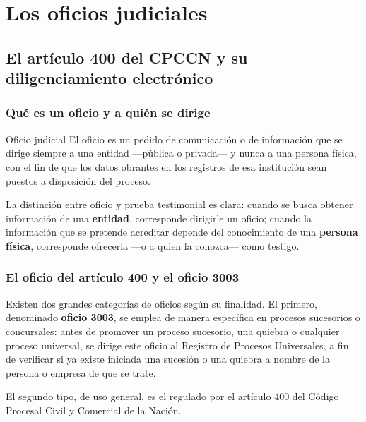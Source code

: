 \documentclass[12pt,oneside]{book}
\begin{document}
\chapter{Los oficios judiciales}

\section{El artículo 400 del CPCCN y su diligenciamiento electrónico}

\subsection{Qué es un oficio y a quién se dirige}

\begin{definition}{Oficio judicial}
El oficio es un pedido de comunicación o de información que se dirige siempre a una entidad —pública o privada— y nunca a una persona física, con el fin de que los datos obrantes en los registros de esa institución sean puestos a disposición del proceso.
\end{definition}

\begin{note}
La distinción entre oficio y prueba testimonial es clara: cuando se busca obtener información de una \textbf{entidad}, corresponde dirigirle un oficio; cuando la información que se pretende acreditar depende del conocimiento de una \textbf{persona física}, corresponde ofrecerla —o a quien la conozca— como testigo.
\end{note}

\subsection{El oficio del artículo 400 y el oficio 3003}

Existen dos grandes categorías de oficios según su finalidad. El primero, denominado \textbf{oficio 3003}, se emplea de manera específica en procesos sucesorios o concursales: antes de promover un proceso sucesorio, una quiebra o cualquier proceso universal, se dirige este oficio al Registro de Procesos Universales, a fin de verificar si ya existe iniciada una sucesión o una quiebra a nombre de la persona o empresa de que se trate.

El segundo tipo, de uso general, es el regulado por el artículo 400 del Código Procesal Civil y Comercial de la Nación.
\end{document}
